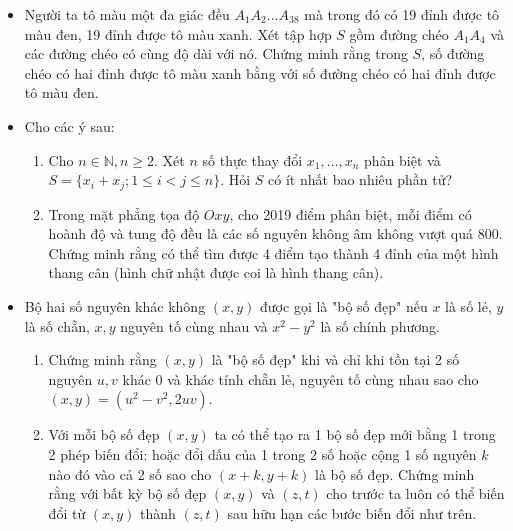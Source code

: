 \documentclass[11pt]{scrartcl}
\begin{document}
\begin{itemize}[label=, leftmargin=0em, itemsep=-0em]
\begin{btvn}
    \end{btvn}
    \item \begin{btvn} Người ta tô màu một đa giác đều $A_1A_2...A_{38}$ mà trong đó có 19 đỉnh được tô màu đen, 19 đỉnh được tô màu xanh. Xét tập hợp $S$ gồm đường chéo $A_1A_4$ và các đường chéo có cùng độ dài với nó. Chứng minh rằng trong $S$, số đường chéo có hai đỉnh được tô màu xanh bằng với số đường chéo có hai đỉnh được tô màu đen.
    \end{btvn}
    \item \begin{btvn} Cho các ý sau:
    \begin{enumerate}
        \item Cho $n \in \mathbb{N}, n \geq 2$. Xét $n$ số thực thay đổi $x_1, \ldots, x_n$ phân biệt và $S = \{x_i + x_j; 1 \leq i < j \leq n\}$. Hỏi $S$ có ít nhất bao nhiêu phần tử?
        \item Trong mặt phẳng tọa độ $Oxy$, cho 2019 điểm phân biệt, mỗi điểm có hoành độ và tung độ đều là các số nguyên không âm không vượt quá 800. Chứng minh rằng có thể tìm được 4 điểm tạo thành 4 đỉnh của một hình thang cân (hình chữ nhật được coi là hình thang cân).
    \end{enumerate}
    \end{btvn}
    \item \begin{btvn}
    Bộ hai số nguyên khác không $(x, y)$ được gọi là "bộ số đẹp" nếu $x$ là số lẻ, $y$ là số chẵn, $x, y$ nguyên tố cùng nhau và $x^2 - y^2$ là số chính phương.
    \begin{enumerate}
        \item Chứng minh rằng $(x, y)$ là "bộ số đẹp" khi và chỉ khi tồn tại 2 số nguyên $u, v$ khác $0$ và khác tính chẵn lẻ, nguyên tố cùng nhau sao cho $(x, y) = (u^2 - v^2, 2uv)$.
        \item Với mỗi bộ số đẹp $(x, y)$ ta có thể tạo ra 1 bộ số đẹp mới bằng 1 trong 2 phép biến đổi: hoặc đổi dấu của 1 trong 2 số hoặc cộng 1 số nguyên $k$ nào đó vào cả 2 số sao cho $(x + k, y + k)$ là bộ số đẹp. Chứng minh rằng với bất kỳ bộ số đẹp $(x, y)$ và $(z, t)$ cho trước ta luôn có thể biến đổi từ $(x, y)$ thành $(z, t)$ sau hữu hạn các bước biến đổi như trên.
    \end{enumerate}
    

\end{btvn}
\end{itemize}
\end{document}
